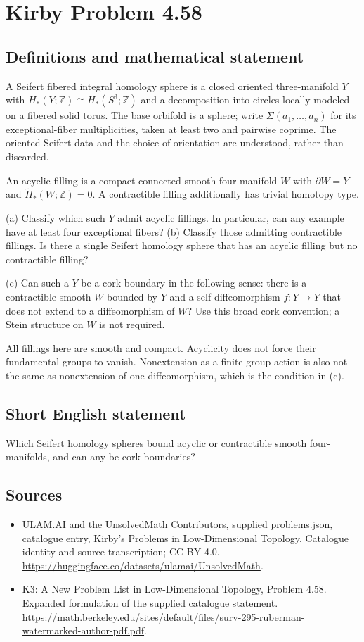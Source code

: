 \documentclass[11pt,a4paper]{article}
\begin{document}
\section*{Kirby Problem 4.58}\label{statement}

\subsection{Definitions and mathematical statement}
A Seifert fibered integral homology sphere is a closed oriented three-manifold $Y$ with $H_*(Y;\mathbb Z)\cong H_*(S^3;\mathbb Z)$ and a decomposition into circles locally modeled on a fibered solid torus. The base orbifold is a sphere; write $\Sigma(a_1,\ldots,a_n)$ for its exceptional-fiber multiplicities, taken at least two and pairwise coprime. The oriented Seifert data and the choice of orientation are understood, rather than discarded.

An acyclic filling is a compact connected smooth four-manifold $W$ with $\partial W=Y$ and $\widetilde H_*(W;\mathbb Z)=0$. A contractible filling additionally has trivial homotopy type.

(a) Classify which such $Y$ admit acyclic fillings. In particular, can any example have at least four exceptional fibers? (b) Classify those admitting contractible fillings. Is there a single Seifert homology sphere that has an acyclic filling but no contractible filling?

(c) Can such a $Y$ be a cork boundary in the following sense: there is a contractible smooth $W$ bounded by $Y$ and a self-diffeomorphism $f:Y\to Y$ that does not extend to a diffeomorphism of $W$? Use this broad cork convention; a Stein structure on $W$ is not required.

All fillings here are smooth and compact. Acyclicity does not force their fundamental groups to vanish. Nonextension as a finite group action is also not the same as nonextension of one diffeomorphism, which is the condition in (c).
\subsection{Short English statement}
Which Seifert homology spheres bound acyclic or contractible smooth four-manifolds, and can any be cork boundaries?
\subsection{Sources}
\begin{itemize}
\item[S1] ULAM.AI and the UnsolvedMath Contributors, supplied problems.json, catalogue entry, Kirby's Problems in Low-Dimensional Topology. Catalogue identity and source transcription; CC BY 4.0.
\url{https://huggingface.co/datasets/ulamai/UnsolvedMath}.
\item[S2] K3: A New Problem List in Low-Dimensional Topology, Problem 4.58. Expanded formulation of the supplied catalogue statement.
\url{https://math.berkeley.edu/sites/default/files/surv-295-ruberman-watermarked-author-pdf.pdf}.
\end{itemize}
\end{document}
